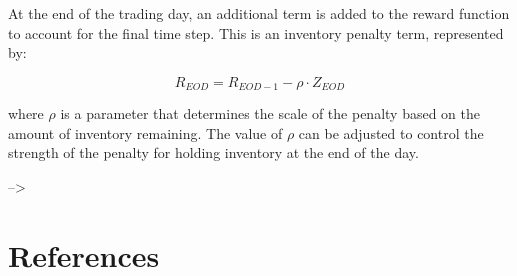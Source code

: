 \documentclass[
  12pt,
  a4paper,
  DIV=11,
  numbers=noendperiod]{scrartcl}
\begin{document}
At the end of the trading day, an additional term is added to the reward
function to account for the final time step. This is an inventory
penalty term, represented by:

\[
R_{EOD} = R_{EOD-1} - \rho \cdot Z_{EOD}
\]

where \(\rho\) is a parameter that determines the scale of the penalty
based on the amount of inventory remaining. The value of \(\rho\) can be
adjusted to control the strength of the penalty for holding inventory at
the end of the day.

--\textgreater{}

\hypertarget{references}{%
\section*{References}\label{references}}
\end{document}
